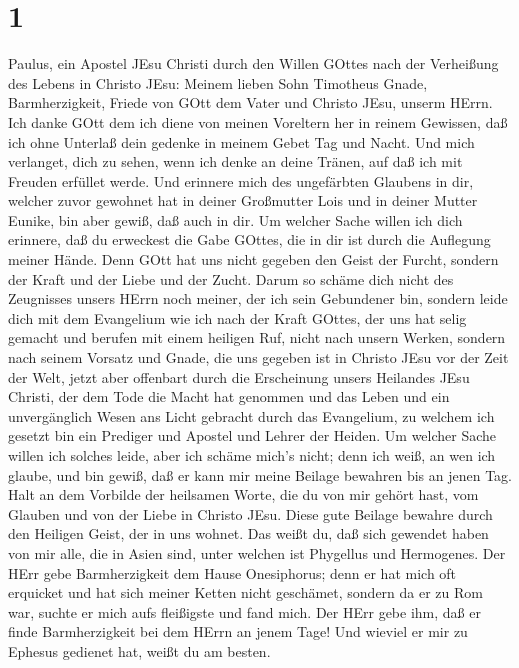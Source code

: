 \hypertarget{section}{%
\section{1}\label{section}}

 Paulus, ein Apostel JEsu Christi durch den Willen GOttes
nach der Verheißung des Lebens in Christo JEsu:  Meinem
lieben Sohn Timotheus Gnade, Barmherzigkeit, Friede von GOtt dem Vater
und Christo JEsu, unserm HErrn.  Ich danke GOtt dem ich
diene von meinen Voreltern her in reinem Gewissen, daß ich ohne Unterlaß
dein gedenke in meinem Gebet Tag und Nacht.  Und mich
verlanget, dich zu sehen, wenn ich denke an deine Tränen, auf daß ich
mit Freuden erfüllet werde.  Und erinnere mich des
ungefärbten Glaubens in dir, welcher zuvor gewohnet hat in deiner
Großmutter Lois und in deiner Mutter Eunike, bin aber gewiß, daß auch in
dir.  Um welcher Sache willen ich dich erinnere, daß du
erweckest die Gabe GOttes, die in dir ist durch die Auflegung meiner
Hände.  Denn GOtt hat uns nicht gegeben den Geist der
Furcht, sondern der Kraft und der Liebe und der Zucht. 
Darum so schäme dich nicht des Zeugnisses unsers HErrn noch meiner, der
ich sein Gebundener bin, sondern leide dich mit dem Evangelium wie ich
nach der Kraft GOttes,  der uns hat selig gemacht und
berufen mit einem heiligen Ruf, nicht nach unsern Werken, sondern nach
seinem Vorsatz und Gnade, die uns gegeben ist in Christo JEsu vor der
Zeit der Welt,  jetzt aber offenbart durch die Erscheinung
unsers Heilandes JEsu Christi, der dem Tode die Macht hat genommen und
das Leben und ein unvergänglich Wesen ans Licht gebracht durch das
Evangelium,  zu welchem ich gesetzt bin ein Prediger und
Apostel und Lehrer der Heiden.  Um welcher Sache willen ich
solches leide, aber ich schäme mich's nicht; denn ich weiß, an wen ich
glaube, und bin gewiß, daß er kann mir meine Beilage bewahren bis an
jenen Tag.  Halt an dem Vorbilde der heilsamen Worte, die
du von mir gehört hast, vom Glauben und von der Liebe in Christo JEsu.
 Diese gute Beilage bewahre durch den Heiligen Geist, der
in uns wohnet.  Das weißt du, daß sich gewendet haben von
mir alle, die in Asien sind, unter welchen ist Phygellus und Hermogenes.
 Der HErr gebe Barmherzigkeit dem Hause Onesiphorus; denn
er hat mich oft erquicket und hat sich meiner Ketten nicht geschämet,
 sondern da er zu Rom war, suchte er mich aufs fleißigste
und fand mich.  Der HErr gebe ihm, daß er finde
Barmherzigkeit bei dem HErrn an jenem Tage! Und wieviel er mir zu
Ephesus gedienet hat, weißt du am besten.

